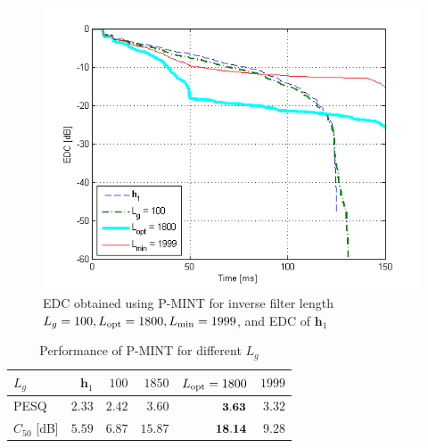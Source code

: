 \documentclass{article}
\begin{document}
\begin{figure}[t!]
\includegraphics[scale=0.6]{EUSIPCOplots/EDC_pmint_vs_Lg_sys_5_Cm_-33}
  \vspace{-0.6cm}
\caption{EDC obtained using P-MINT for inverse filter length $L_g = 100, L_{\rm opt} = 1800, L_{\min} = 1999 $, and EDC of $\mathbf{h}_1$}
\label{fig: EDC_pmint}
\vspace{-0.5cm}
\end{figure}
\begin{table}[t]
\footnotesize
\centering
\caption{Performance of P-MINT for different $L_g$}
\label{tbl: pmint}
 \begin{tabular}{|l|r|r|r|r|r|}
   \hline
   $L_g$ & $\mathbf{h}_1$ & $100$ & $1850$ & $L_{\rm opt} = 1800$ & $1999$   \\ \hline
   PESQ & $2.33$ & $2.42$ & $3.60$ & $\bf{3.63}$ & $3.32$ \\ \hline
   $C_{50}$ [dB] & $5.59$ & $6.87$ & $15.87$ & $\bf{18.14}$ & $9.28$ \\ \hline
\end{tabular}
\vspace{-0.1cm}
\end{table}








\vspace{-0.4cm}



\end{document}
